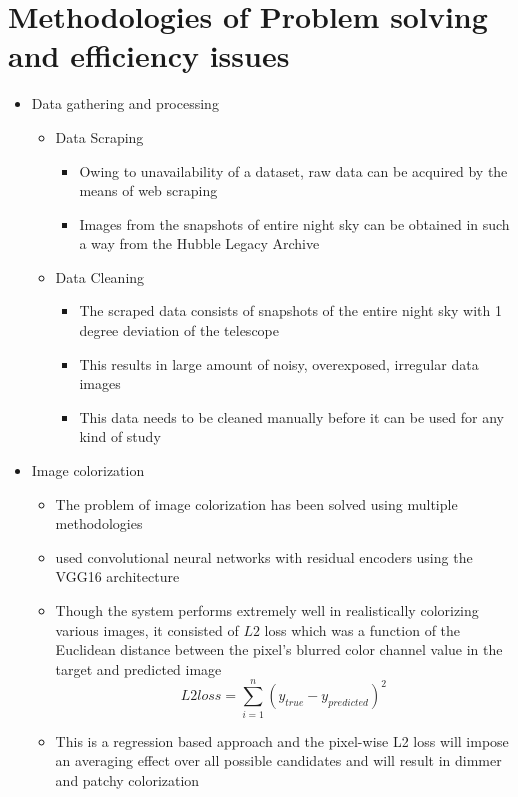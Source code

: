 \documentclass[oneside,a4paper,12pt]{report}
\begin{document}
\section{Methodologies of Problem solving and efficiency issues}
\begin{itemize}
	\item Data gathering and processing
	\begin{itemize}
	\item Data Scraping
		\begin{itemize}
		\item Owing to unavailability of a dataset, raw data can be acquired by the means of web scraping
		\item Images from the snapshots of entire night sky can be obtained in such a way from the Hubble Legacy Archive
		\end{itemize}
	\item Data Cleaning
		\begin{itemize}
		\item The scraped data consists of snapshots of the entire night sky with 1 degree deviation of the telescope
		\item This results in large amount of noisy, overexposed, irregular data images
		\item This data needs to be cleaned manually before it can be used for any kind of study
		\end{itemize}
	\end{itemize}
	\item Image colorization
	\begin{itemize}
		\item The problem of image colorization has been solved using multiple methodologies
		\item \cite{dahl2016automatic} used convolutional neural networks with residual encoders using the VGG16 architecture
		\item Though the system performs extremely well in realistically colorizing various images, it consisted of $L2$ loss which was a function of the Euclidean distance between the pixel's blurred color channel value in the target and predicted image
		\begin{equation}
			L2 loss = \sum_{i=1}^n(y_{true} - y_{predicted})^2
		\end{equation}
		\item This is a regression based approach and the pixel-wise L2 loss will impose an averaging effect over all possible candidates and will result in dimmer and patchy colorization

\end{itemize}
\end{itemize}
\end{document}
